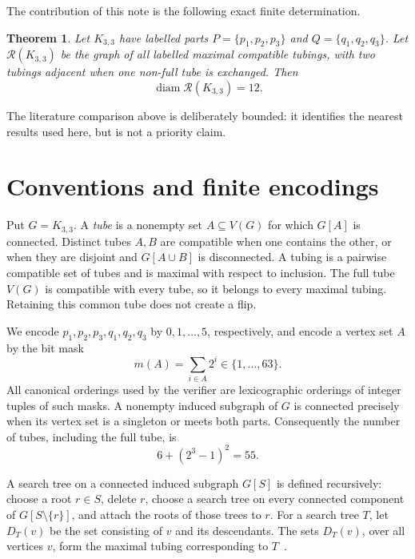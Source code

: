 \documentclass[11pt]{article}
\newtheorem{theorem}{Theorem}
\newcommand{\Rcal}{\mathcal{R}}
\begin{document}
The contribution of this note is the following exact finite determination.

\begin{theorem}\label{thm:main}
Let \(K_{3,3}\) have labelled parts
\(P=\{p_1,p_2,p_3\}\) and \(Q=\{q_1,q_2,q_3\}\).  Let
\(\Rcal(K_{3,3})\) be the graph of all labelled maximal compatible tubings,
with two tubings adjacent when one non-full tube is exchanged.  Then
\[
  \operatorname{diam}\Rcal(K_{3,3})=12.
\]
\end{theorem}

The literature comparison above is deliberately bounded: it identifies the
nearest results used here, but is not a priority claim.

\section{Conventions and finite encodings}

Put \(G=K_{3,3}\).  A \emph{tube} is a nonempty set
\(A\subseteq V(G)\) for which \(G[A]\) is connected.  Distinct tubes \(A,B\)
are compatible when one contains the other, or when they are disjoint and
\(G[A\cup B]\) is disconnected.  A tubing is a pairwise compatible set of
tubes and is maximal with respect to inclusion.  The full tube \(V(G)\) is
compatible with every tube, so it belongs to every maximal tubing.  Retaining
this common tube does not create a flip.

We encode \(p_1,p_2,p_3,q_1,q_2,q_3\) by \(0,1,\ldots,5\), respectively, and
encode a vertex set \(A\) by the bit mask
\[
  m(A)=\sum_{i\in A}2^i\in\{1,\ldots,63\}.
\]
All canonical orderings used by the verifier are lexicographic orderings of
integer tuples of such masks.  A nonempty induced subgraph of \(G\) is
connected precisely when its vertex set is a singleton or meets both parts.
Consequently the number of tubes, including the full tube, is
\begin{equation}\label{eq:tubes}
  6+(2^3-1)^2=55.
\end{equation}

A search tree on a connected induced subgraph \(G[S]\) is defined recursively:
choose a root \(r\in S\), delete \(r\), choose a search tree on every connected
component of \(G[S\setminus\{r\}]\), and attach the roots of those trees to
\(r\).  For a search tree \(T\), let \(D_T(v)\) be the set consisting of \(v\)
and its descendants.  The sets \(D_T(v)\), over all vertices \(v\), form the
maximal tubing corresponding to \(T\)~\cite{CardinalPourninValenciaPabon2022}.
\end{document}

